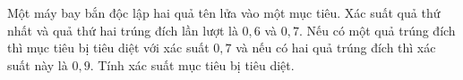 \begin{ex}
Một máy bay bắn độc lập hai quả tên lửa vào một mục tiêu. Xác suất quả thứ nhất và quả thứ hai trúng đích lần lượt là $0{,}6$ và $0{,}7$. Nếu có một quả trúng đích thì mục tiêu bị tiêu diệt với xác suất $0{,}7$ và nếu có hai quả trúng đích thì xác suất này là $0{,}9$. Tính xác suất mục tiêu bị tiêu diệt.
\end{ex}
